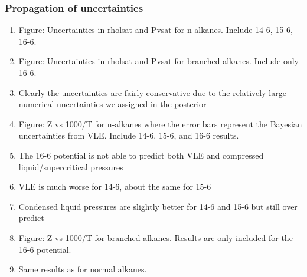 \documentclass[preprint,letterpaper,floatfix,citeautoscript,aip,jcp]{revtex4-1}
\begin{document}
\subsubsection{Propagation of uncertainties}

\begin{enumerate}
	\item Figure: Uncertainties in rholsat and Pvsat for n-alkanes. Include 14-6, 15-6, 16-6.
	\item Figure: Uncertainties in rholsat and Pvsat for branched alkanes. Include only 16-6.
	\item Clearly the uncertainties are fairly conservative due to the relatively large numerical uncertainties we assigned in the posterior
	\item Figure: Z vs 1000/T for n-alkanes where the error bars represent the Bayesian uncertainties from VLE. Include 14-6, 15-6, and 16-6 results.
	\item The 16-6 potential is not able to predict both VLE and compressed liquid/supercritical pressures
	\item VLE is much worse for 14-6, about the same for 15-6
	\item Condensed liquid pressures are slightly better for 14-6 and 15-6 but still over predict
	\item Figure: Z vs 1000/T for branched alkanes. Results are only included for the 16-6 potential.
	\item Same results as for normal alkanes.
\end{enumerate}
\end{document}
